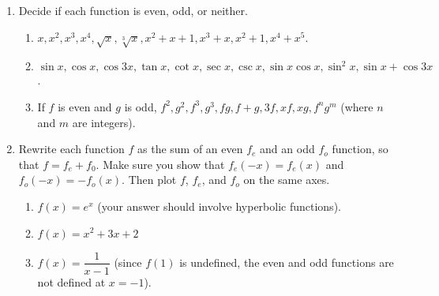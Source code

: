 \begin{enumerate}
	
	\item Decide if each function is even, odd, or neither.	
\begin{enumerate}
	\item $x,x^2,x^3,x^4,\sqrt{x},\sqrt[3]{x}, x^2+x+1, x^3+x, x^2+1, x^4+x^5$.
	\item $\sin x, \cos x,\cos 3x, \tan x, \cot x, \sec x, \csc x, \sin x \cos x, \sin^2 x, \sin x+\cos 3x$.
	\item If $f$ is even and $g$ is odd, $f^2, g^2, f^3, g^3, fg, f+g, 3f, xf, xg,f^ng^m$ (where $n$ and $m$ are integers).
\end{enumerate}

	\item Rewrite each function $f$ as the sum of an even $f_e$ and an odd $f_o$ function, so that $f=f_e+f_0$. Make sure you show that $f_e(-x)=f_e(x)$ and $f_o(-x)=-f_o(x)$. Then plot $f$, $f_e$, and $f_o$ on the same axes.
\begin{enumerate}
	\item $f(x)=e^x$ (your answer should involve hyperbolic functions).
	\item $f(x)=x^2+3x+2$
	\item $f(x)=\dfrac{1}{x-1}$ (since $f(1)$ is undefined, the even and odd functions are not defined at $x=-1$).
\end{enumerate}


\end{enumerate}
